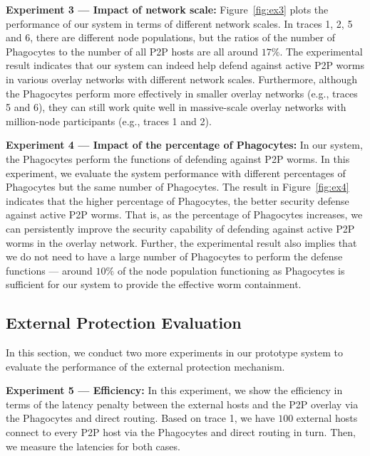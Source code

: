 \documentclass[times,10pt,twocolumn]{article}
\begin{document}
\textbf{Experiment 3 --- Impact of network scale:}
Figure~\ref{fig:ex3} plots the performance of our system in terms of
different network scales. In traces 1, 2, 5 and 6, there are
different node populations, but the ratios of the number of
Phagocytes to the number of all P2P hosts are all around $17\%$. The
experimental result indicates that our system can indeed help defend
against active P2P worms in various overlay networks with different
network scales. Furthermore, although the Phagocytes perform more
effectively in smaller overlay networks (e.g., traces 5 and 6), they
can still work quite well in massive-scale overlay networks with
million-node participants (e.g., traces 1 and 2).






\textbf{Experiment 4 --- Impact of the percentage of Phagocytes:} In
our system, the Phagocytes perform the functions of defending
against P2P worms. In this experiment, we evaluate the system
performance with different percentages of Phagocytes but the same
number of Phagocytes. The result in Figure~\ref{fig:ex4} indicates
that the higher percentage of Phagocytes, the better security
defense against active P2P worms. That is, as the percentage of
Phagocytes increases, we can persistently improve the security
capability of defending against active P2P worms in the overlay
network. Further, the experimental result also implies that we do
not need to have a large number of Phagocytes to perform the defense
functions
--- around $10\%$ of the node population functioning as Phagocytes
is sufficient for our system to provide the effective worm
containment.




\subsection{External Protection Evaluation}




In this section, we conduct two more experiments in our prototype
system to evaluate the performance of the external protection
mechanism.




\textbf{Experiment 5 --- Efficiency:} In this experiment, we show
the efficiency in terms of the latency penalty between the external
hosts and the P2P overlay via the Phagocytes and direct routing.
Based on trace 1, we have $100$ external hosts connect to every P2P
host via the Phagocytes and direct routing in turn. Then, we measure
the latencies for both cases.
\end{document}

